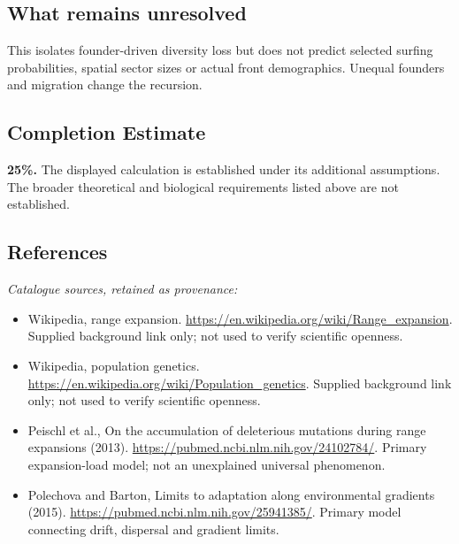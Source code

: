 \documentclass[11pt]{article}
\begin{document}
\subsection{What remains unresolved}
This isolates founder-driven diversity loss but does not predict selected surfing probabilities, spatial sector sizes or actual front demographics. Unequal founders and migration change the recursion.
\subsection{Completion Estimate}
\textbf{25\%.} The displayed calculation is established under its additional assumptions. The broader theoretical and biological requirements listed above are not established.
\subsection{References}
\noindent\emph{Catalogue sources, retained as provenance:}
\begin{itemize}
\item Wikipedia, range expansion. \url{https://en.wikipedia.org/wiki/Range_expansion}. Supplied background link only; not used to verify scientific openness.
\item Wikipedia, population genetics. \url{https://en.wikipedia.org/wiki/Population_genetics}. Supplied background link only; not used to verify scientific openness.
\item Peischl et al., On the accumulation of deleterious mutations during range expansions (2013). \url{https://pubmed.ncbi.nlm.nih.gov/24102784/}. Primary expansion-load model; not an unexplained universal phenomenon.
\item Polechova and Barton, Limits to adaptation along environmental gradients (2015). \url{https://pubmed.ncbi.nlm.nih.gov/25941385/}. Primary model connecting drift, dispersal and gradient limits.
\end{itemize}
\clearpage


\appendix
\end{document}
